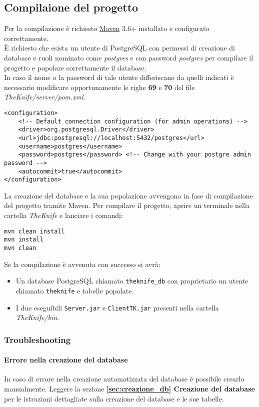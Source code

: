 \subsection{Compilaione del progetto}
\label{sec:compilazione}
Per la compilazione è richiesto \href{maven.apache.org}{Maven} 3.6+ installato e configurato correttamente.\\
\`E richiesto che esista un utente di PostgreSQL con permessi 
di creazione di database e ruoli nominato come \textit{postgres} e con 
password \textit{postgres} per compilare il progetto e popolare correttamente 
il database.\\
In caso il nome o la password di tale utente differiscano da quelli 
indicati
è necessario modificare opportunamente le righe \textbf{69} e \textbf{70} 
del file \textit{TheKnife/server/pom.xml}.
\begin{verbatim}
<configuration>
    <!-- Default connection configuration (for admin operations) -->
    <driver>org.postgresql.Driver</driver>
    <url>jdbc:postgresql://localhost:5432/postgres</url>
    <username>postgres</username>
    <password>postgres</password> <!-- Change with your postgre admin password -->
    <autocommit>true</autocommit>
</configuration>
\end{verbatim}
La creazione del database e la sua popolazione avvengono in fase di 
compilazione del progetto tramite Maven.
Per compilare il progetto, aprire un terminale nella cartella 
\textit{TheKnife} e lanciare i comandi:
\begin{verbatim}
mvn clean install
mvn install
mvn clean
\end{verbatim}
Se la compilazione è avvenuta con successo si avrà:
\begin{itemize}
    \item Un database PostgreSQL chiamato \texttt{theknife\_db} 
    con proprietario un utente chiamato \texttt{theknife}
    e tabelle popolate.
    \item I due eseguibili \texttt{Server.jar} e \texttt{ClientTK.jar} presenti
    nella cartella \textit{TheKnife/bin}.
\end{itemize}

\subsubsection{Troubleshooting}
\paragraph{Errore nella creazione del database}
In caso di errore nella creazione automatizzata del database è 
possibile crearlo manualmente. 
Leggere la sezione \textbf{\ref{sec:creazione_db} Creazione del database} 
per le istruzioni dettagliate sulla creazione del database e le sue tabelle.
